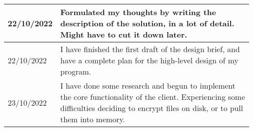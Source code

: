 \documentclass{article}
\begin{document}
\begin{longtable}{p{}p{}}
\midrule
22/10/2022 & Formulated my thoughts by writing the description of the solution, in a lot of detail. Might have to cut it down later.\\
\midrule
22/10/2022 & I have finished the first draft of the design brief, and have a complete plan for the high-level design of my program.\\
\midrule
23/10/2022 & I have done some research and begun to implement the core functionality of the client. Experiencing some difficulties deciding to encrypt files on disk, or to pull them into memory.\\
\bottomrule
\end{longtable}
\end{document}
